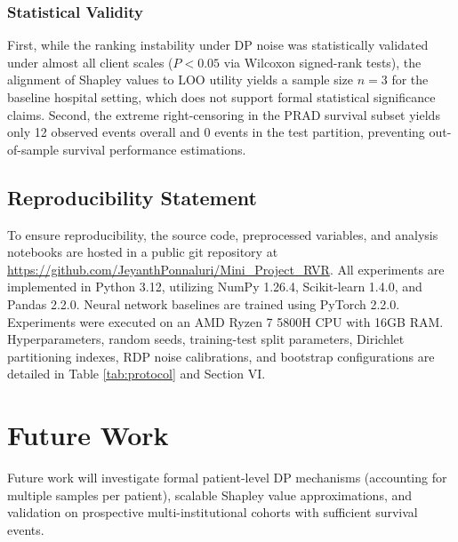 \documentclass[conference]{IEEEtran}
\begin{document}
\subsubsection{Statistical Validity}
First, while the ranking instability under DP noise was statistically validated under almost all client scales ($P < 0.05$ via Wilcoxon signed-rank tests), the alignment of Shapley values to LOO utility yields a sample size $n=3$ for the baseline hospital setting, which does not support formal statistical significance claims. Second, the extreme right-censoring in the PRAD survival subset yields only 12 observed events overall and 0 events in the test partition, preventing out-of-sample survival performance estimations.

\subsection{Reproducibility Statement}
To ensure reproducibility, the source code, preprocessed variables, and analysis notebooks are hosted in a public git repository at \url{https://github.com/JeyanthPonnaluri/Mini_Project_RVR}. All experiments are implemented in Python 3.12, utilizing NumPy 1.26.4, Scikit-learn 1.4.0, and Pandas 2.2.0. Neural network baselines are trained using PyTorch 2.2.0. Experiments were executed on an AMD Ryzen 7 5800H CPU with 16GB RAM. Hyperparameters, random seeds, training-test split parameters, Dirichlet partitioning indexes, RDP noise calibrations, and bootstrap configurations are detailed in Table \ref{tab:protocol} and Section VI.


\section{Future Work}
Future work will investigate formal patient-level DP mechanisms (accounting for multiple samples per patient), scalable Shapley value approximations, and validation on prospective multi-institutional cohorts with sufficient survival events.
\end{document}
